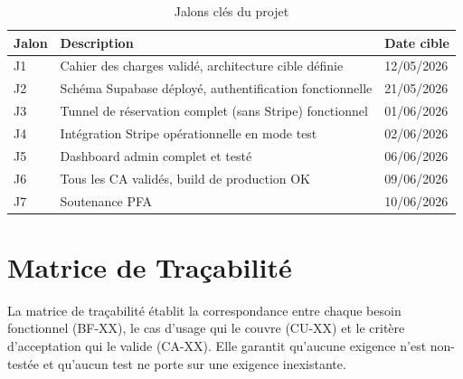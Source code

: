 \documentclass[12pt,a4paper,openany]{report}
\begin{document}
\begin{table}[H]
\centering
\begin{tabular}{lll}
\toprule
\textbf{Jalon} & \textbf{Description} & \textbf{Date cible} \\
\midrule
J1 & Cahier des charges validé, architecture cible définie & 12/05/2026 \\
J2 & Schéma Supabase déployé, authentification fonctionnelle & 21/05/2026 \\
J3 & Tunnel de réservation complet (sans Stripe) fonctionnel & 01/06/2026 \\
J4 & Intégration Stripe opérationnelle en mode test & 02/06/2026 \\
J5 & Dashboard admin complet et testé & 06/06/2026 \\
J6 & Tous les CA validés, build de production OK & 09/06/2026 \\
J7 & Soutenance PFA & 10/06/2026 \\
\bottomrule
\end{tabular}
\caption{Jalons clés du projet}
\end{table}

\chapter{Matrice de Traçabilité}

La matrice de traçabilité établit la correspondance entre chaque besoin fonctionnel (BF-XX), le cas d'usage qui le couvre (CU-XX) et le critère d'acceptation qui le valide (CA-XX). Elle garantit qu'aucune exigence n'est non-testée et qu'aucun test ne porte sur une exigence inexistante.
\end{document}
